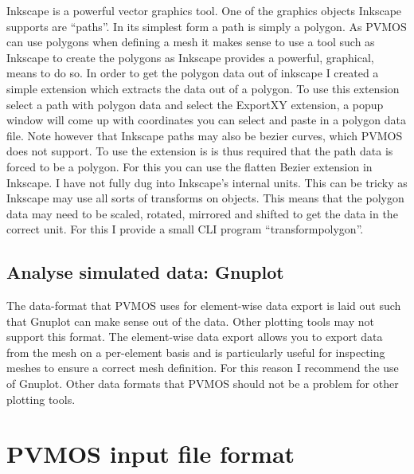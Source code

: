 \documentclass[noshowpacs,preprintnumbers,amsmath,amssymb, letter]{revtex4}
\begin{document}
Inkscape is a powerful vector graphics tool. One of the graphics objects Inkscape supports are ``paths''. In its simplest form a path is simply a polygon. As PVMOS can use polygons when defining a mesh it makes sense to use a tool such as Inkscape to create the polygons as Inkscape provides a powerful, graphical, means to do so. In order to get the polygon data out of inkscape I created a simple extension which extracts the data out of a polygon. To use this extension select a path with polygon data and select the ExportXY extension, a popup window will come up with coordinates you can select and paste in a polygon data file. Note however that Inkscape paths may also be bezier curves, which PVMOS does not support. To use the extension is is thus required that the path data is forced to be a polygon. For this you can use the flatten Bezier extension in Inkscape. I have not fully dug into Inkscape's internal units. This can be tricky as Inkscape may use all sorts of transforms on objects. This means that the polygon data may need to be scaled, rotated, mirrored and shifted to get the data in the correct unit. For this I provide a small CLI program ``transformpolygon''. 


\subsection{Analyse simulated data: Gnuplot}
The data-format that PVMOS uses for element-wise data export is laid out such that Gnuplot can make sense out of the data. Other plotting tools may not support this format. The element-wise data export allows you to export data from the mesh on a per-element basis and is particularly useful for inspecting meshes to ensure a correct mesh definition. For this reason I recommend the use of Gnuplot. Other data formats that PVMOS should not be a problem for other plotting tools.

\section{\label{syntax}PVMOS input file format}
\end{document}
